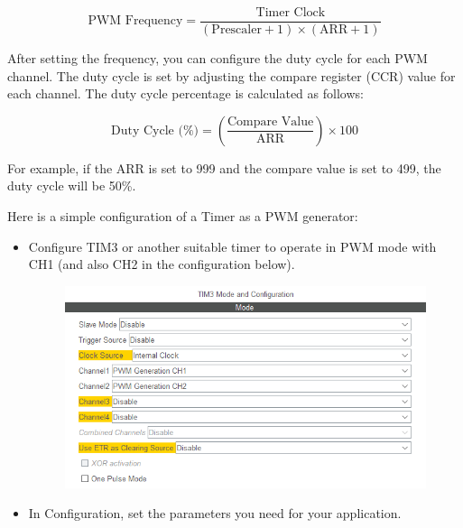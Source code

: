 \documentclass[10pt,a4paper,onecolumn]{article}
\providecommand{\tightlist}{%
  \setlength{\itemsep}{0pt}\setlength{\parskip}{0pt}}
\begin{document}
\[
    \text{PWM Frequency} = \frac{\text{Timer Clock}}{(\text{Prescaler} + 1) \times (\text{ARR} + 1)}
\]

After setting the frequency, you can configure the duty cycle for each
PWM channel. The duty cycle is set by adjusting the compare register
(CCR) value for each channel. The duty cycle percentage is calculated as
follows:

\[
    \text{Duty Cycle (\%)} = \left( \frac{\text{Compare Value}}{\text{ARR}} \right) \times 100
\]

For example, if the ARR is set to 999 and the compare value is set to
499, the duty cycle will be 50\%.

Here is a simple configuration of a Timer as a PWM generator:

\begin{itemize}
\tightlist
\item
  Configure TIM3 or another suitable timer to operate in PWM mode with
  CH1 (and also CH2 in the configuration below).

  \begin{figure}[H]
    \begin{center}
      \includegraphics[width=\dimexpr\textwidth-1cm\relax,height=\dimexpr0.25\textheight-1cm\relax,keepaspectratio]{images/57.png}
    \end{center}
  \end{figure}

\item
  In Configuration, set the parameters you need for your application.


\end{itemize}
\end{document}
